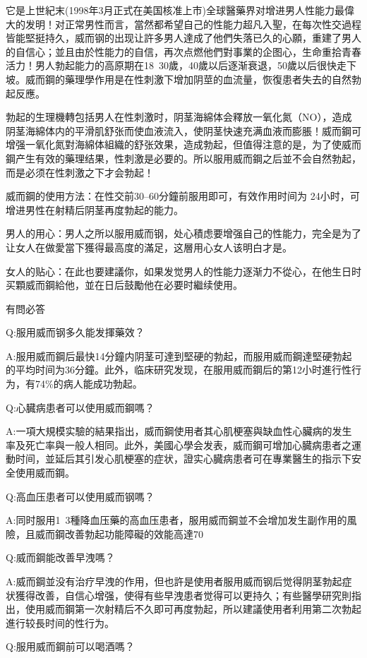 \documentclass[12pt,UTF8]{ctexbook}
\begin{document}
它是上世紀末(1998年3月正式在美国核准上市)全球醫藥界对增进男人性能力最偉大的发明！对正常男性而言，當然都希望自己的性能力超凡入聖，在每次性交過程皆能堅挺持久，威而钢的出现让許多男人達成了他們失落已久的心願，重建了男人的自信心；並且由於性能力的自信，再次点燃他們對事業的企图心，生命重拾青春活力！男人勃起能力的高原期在18~30歲，40歲以后逐渐衰退，50歲以后很快走下坡。威而鋼的藥理學作用是在性刺激下增加阴莖的血流量，恢復患者失去的自然勃起反應。

勃起的生理機轉包括男人在性刺激时，阴茎海綿体会釋放一氧化氮（NO），造成阴茎海綿体内的平滑肌舒张而使血液流入，使阴茎快速充满血液而膨脹！威而鋼可增强一氧化氮對海綿体組織的舒张效果，造成勃起，但值得注意的是，为了使威而鋼产生有效的藥理结果，性刺激是必要的。所以服用威而鋼之后並不会自然勃起，而是必须在性刺激之下才会勃起！

威而鋼的使用方法：在性交前30--60分鐘前服用即可，有效作用时间为
24小时，可增进男性在射精后阴茎再度勃起的能力。

男人的用心：男人之所以服用威而钢，处心積虑要增强自己的性能力，完全是为了让女人在做愛當下獲得最高度的滿足，这層用心女人该明白才是。

女人的贴心：在此也要建議你，如果发觉男人的性能力逐渐力不從心，在他生日时买顆威而鋼給他，並在日后鼓勵他在必要时繼续使用。

有問必答

Q:服用威而钢多久能发揮藥效？

A:服用威而鋼后最快14分鐘内阴茎可達到堅硬的勃起，而服用威而鋼達堅硬勃起的平均时间为36分鐘。此外，临床研究发现，在服用威而鋼后的第12小时進行性行为，有74\%的病人能成功勃起。

Q:心臓病患者可以使用威而鋼嗎？

A:一項大規模实驗的結果指出，威而鋼使用者其心肌梗塞與缺血性心臟病的发生率及死亡率與一般人相同。此外，美國心學会发表，威而鋼可增加心臓病患者之運動时间，並延后其引发心肌梗塞的症状，證实心臓病患者可在專業醫生的指示下安全使用威而鋼。

Q:高血压患者可以使用威而钢嗎？

A:同时服用1~3種降血压藥的高血压患者，服用威而鋼並不会增加发生副作用的風險，且威而鋼改善勃起功能障礙的效能高達70%

Q:威而鋼能改善早洩嗎？

A:威而鋼並没有治疗早洩的作用，但也許是使用者服用威而钢后觉得阴茎勃起症状獲得改善，自信心增强，使得有些早洩患者觉得可以更持久；有些醫學研究則指出，使用威而鋼第一次射精后不久即可再度勃起，所以建議使用者利用第二次勃起進行较長时间的性行为。

Q:服用威而鋼前可以喝酒嗎？
\end{document}
